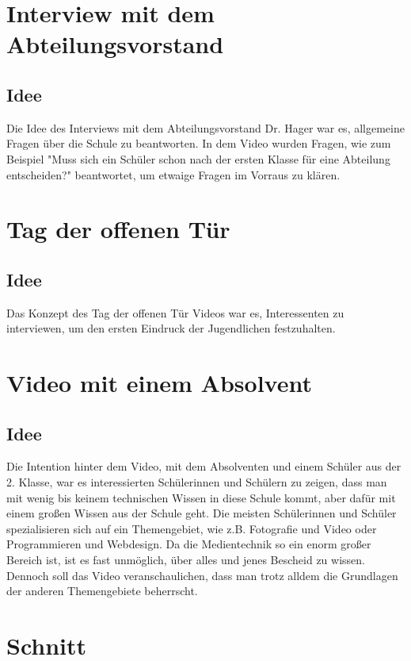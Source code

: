 \section{Interview mit dem Abteilungsvorstand}
\renewcommand{\kapitelautor}{Autor: Kerstin Schön}
\subsection{Idee}
Die Idee des Interviews mit dem Abteilungsvorstand Dr. Hager war es, allgemeine Fragen über die Schule zu beantworten. In dem Video wurden Fragen, wie zum Beispiel "Muss sich ein Schüler schon nach der ersten Klasse für eine Abteilung entscheiden?" beantwortet, um etwaige Fragen im Vorraus zu klären.
 
\section{Tag der offenen Tür}
\renewcommand{\kapitelautor}{Autor: Kerstin Schön}
\subsection{Idee}
Das Konzept des Tag der offenen Tür Videos war es, Interessenten zu interviewen, um den ersten Eindruck der Jugendlichen festzuhalten. 

\section{Video mit einem Absolvent}
\renewcommand{\kapitelautor}{Autor: Kerstin Schön}
\subsection{Idee}
Die Intention hinter dem Video, mit dem Absolventen und einem Schüler aus der 2. Klasse, war es interessierten Schülerinnen und Schülern zu zeigen, dass man mit wenig bis keinem technischen Wissen in diese Schule kommt, aber dafür mit einem großen Wissen aus der Schule geht. Die meisten Schülerinnen und Schüler spezialisieren sich auf ein Themengebiet, wie z.B. Fotografie und Video oder Programmieren und Webdesign. Da die Medientechnik so ein enorm großer Bereich ist, ist es fast unmöglich, über alles und jenes Bescheid zu wissen. Dennoch soll das Video veranschaulichen, dass man trotz alldem die Grundlagen der anderen Themengebiete beherrscht.

\section{Schnitt}


